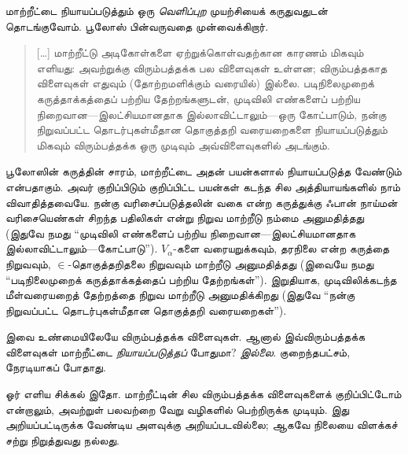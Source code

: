 \documentclass[../../../include/open-logic-section]{subfiles}
\begin{document}

மாற்றீட்டை நியாயப்படுத்தும் ஒரு \emph{வெளிப்புற} முயற்சியைக் கருதுவதுடன்
தொடங்குவோம். பூலோஸ் பின்வருவதை முன்வைக்கிறார்.
\begin{quote}
  [\ldots] மாற்றீட்டு அடிகோள்களை ஏற்றுக்கொள்வதற்கான காரணம் மிகவும்
  எளியது: அவற்றுக்கு விரும்பத்தக்க பல விளைவுகள் உள்ளன; விரும்பத்தகாத
  விளைவுகள் எதுவும் (தோற்றமளிக்கும் வரையில்) இல்லை. படிநிலைமுறைக்
  கருத்தாக்கத்தைப் பற்றிய தேற்றங்களுடன், முடிவிலி எண்களைப் பற்றிய
  நிறைவான---இலட்சியமானதாக இல்லாவிட்டாலும்---ஒரு கோட்பாடும், நன்கு
  நிறுவப்பட்ட தொடர்புகள்மீதான தொகுத்தறி வரையறைகளை நியாயப்படுத்தும் மிகவும்
  விரும்பத்தக்க ஒரு முடிவும் அவ்விளைவுகளில் அடங்கும்.
  \citep[229]{Boolos1971}
\end{quote}
பூலோஸின் கருத்தின் சாரம், மாற்றீட்டை அதன் பயன்களால் நியாயப்படுத்த வேண்டும்
என்பதாகும். அவர் குறிப்பிடும் குறிப்பிட்ட பயன்கள் கடந்த சில அத்தியாயங்களில்
நாம் விவாதித்தவையே. நன்கு வரிசைப்படுத்தலின் வகை என்ற கருத்துக்கு ஃபான்
நாய்மன் வரிசையெண்கள் சிறந்த பதிலிகள் என்று நிறுவ மாற்றீடு நம்மை
அனுமதித்தது (இதுவே நமது ``முடிவிலி எண்களைப் பற்றிய நிறைவான---இலட்சியமானதாக
இல்லாவிட்டாலும்---கோட்பாடு''). $V_\alpha$-களை வரையறுக்கவும், தரநிலை என்ற
கருத்தை நிறுவவும், $\in$-தொகுத்தறிதலை நிறுவவும் மாற்றீடு அனுமதித்தது
(இவையே நமது ``படிநிலைமுறைக் கருத்தாக்கத்தைப் பற்றிய தேற்றங்கள்'').
இறுதியாக, முடிவிலிக்கடந்த மீள்வரையறைத் தேற்றத்தை நிறுவ மாற்றீடு
அனுமதிக்கிறது (இதுவே ``நன்கு நிறுவப்பட்ட தொடர்புகள்மீதான தொகுத்தறி
வரையறைகள்'').

இவை உண்மையிலேயே விரும்பத்தக்க விளைவுகள். ஆனால் இவ்விரும்பத்தக்க விளைவுகள்
மாற்றீட்டை \emph{நியாயப்படுத்தப்} போதுமா? \emph{இல்லை}. குறைந்தபட்சம்,
நேரடியாகப் போதாது.

ஓர் எளிய சிக்கல் இதோ. மாற்றீட்டின் சில விரும்பத்தக்க விளைவுகளைக்
குறிப்பிட்டோம் என்றாலும், அவற்றுள் பலவற்றை வேறு வழிகளில் பெற்றிருக்க
முடியும். இது அறியப்பட்டிருக்க வேண்டிய அளவுக்கு அறியப்படவில்லை; ஆகவே
நிலையை விளக்கச் சற்று நிறுத்துவது நல்லது.
\end{document}
